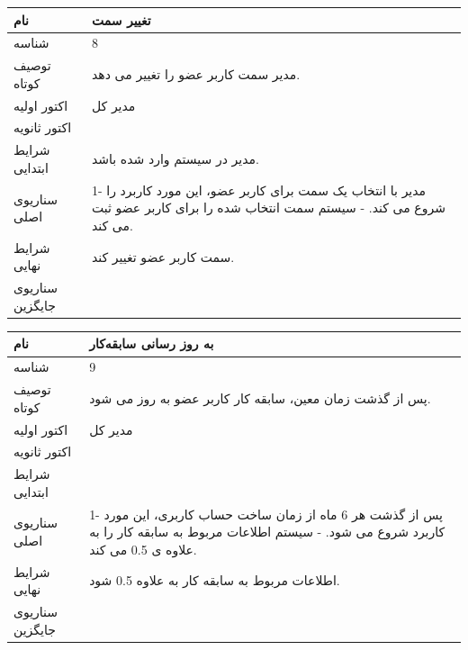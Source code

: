 \documentclass{article}
\begin{document}
\begin{tabular}{|p{2cm}|p{10cm}|}
\hline
نام
&
تغییر سمت
\\
\hline
شناسه
&
8
\\
\hline
توصیف کوتاه
&
مدیر سمت کاربر عضو را تغییر می دهد.
\\
\hline
اکتور اولیه
&
مدیر کل
\\
\hline
اکتور ثانویه
&

\\
\hline
شرایط ابتدایی
&
مدیر در سیستم وارد شده باشد.
\\
\hline
سناریوی اصلی
&
1-	مدیر با انتخاب یک سمت برای کاربر عضو، این مورد کاربرد را شروع می کند.
\newline
2-	سیستم سمت انتخاب شده را برای کاربر عضو ثبت می کند.
\\
\hline
شرایط نهایی
&
سمت کاربر عضو تغییر کند.
\\
\hline
سناریوی جایگزین
&

\\
\hline
\end{tabular}

\vspace{2cm}


\begin{tabular}{|p{2cm}|p{10cm}|}
\hline
نام
&
به روز رسانی سابقه‌کار
\\
\hline
شناسه
&
9
\\
\hline
توصیف کوتاه
&
پس از گذشت زمان معین، سابقه کار کاربر عضو به روز می شود.
\\
\hline
اکتور اولیه
&
مدیر کل
\\
\hline
اکتور ثانویه
&

\\
\hline
شرایط ابتدایی
&

\\
\hline
سناریوی اصلی
&
1-	پس از گذشت هر 6 ماه از زمان ساخت حساب کاربری، این مورد کاربرد شروع می شود.
\newline
2-	سیستم اطلاعات مربوط به سابقه کار را به علاوه ی 0.5 می کند.
\\
\hline
شرایط نهایی
&
اطلاعات مربوط به سابقه کار به علاوه 0.5 شود.
\\
\hline
سناریوی جایگزین
&

\\
\hline
\end{tabular}

\vspace{2cm}
\end{document}
